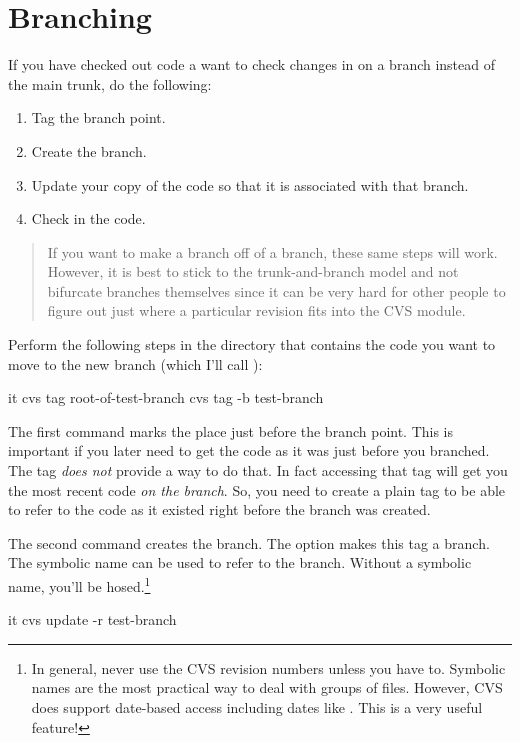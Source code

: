 \documentclass{dods-paper}
\begin{document}
\section{Branching}

If you have checked out code a want to check changes in on a branch instead
of the main trunk, do the following:
\begin{enumerate}
\item Tag the branch point.
\item Create the branch.
\item Update your copy of the code so that it is associated with that branch.
\item Check in the code.
\end{enumerate}

\begin{quote}
If you want to make a branch off of a branch, these same steps will work.
However, it is best to stick to the trunk-and-branch model and not bifurcate
branches themselves since it can be very hard for other people to figure out
just where a particular revision fits into the CVS module.
\end{quote}

Perform the following steps in the directory that contains the code you want
to move to the new branch (which I'll call ):

\begin{vcode}{it}
cvs tag root-of-test-branch
cvs tag -b test-branch
\end{vcode}

The first command marks the place just before the branch point. This is
important if you later need to get the code as it was just before you
branched. The  tag \emph{does not} provide a way to do that.
In fact accessing that tag will get you the most recent code \emph{on the
branch}. So, you need to create a plain tag to be able to refer to the code
as it existed right before the branch was created.

The second command creates the branch. The  option makes this tag a
branch. The symbolic name  can be used to refer to the
branch. Without a symbolic name, you'll be hosed.\footnote{In general, never
  use the CVS revision numbers unless you have to. Symbolic names are the
  most practical way to deal with groups of files. However, CVS does support
  date-based access including dates like . This is a very
  useful feature!}

\begin{vcode}{it}
cvs update -r test-branch
\end{vcode}
\end{document}
